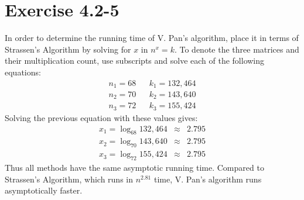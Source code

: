 \documentclass{article}
\begin{document}
\section*{Exercise 4.2-5}

In order to determine the running time of V. Pan's algorithm, place it in terms of Strassen's Algorithm by solving for $x$ in $n^x = k$. To denote the three matrices and their multiplication count, use subscripts and solve each of the following equations:
\begin{eqnarray*}
	n_1 = 68 & & k_1 = 132,464 \\
	n_2 = 70 & & k_2 = 143,640 \\
	n_3 = 72 & & k_3 = 155,424
\end{eqnarray*}
Solving the previous equation with these values gives:
\begin{eqnarray*}
	x_1 = \log_{68}{132,464} & \approx & 2.795 \\
	x_2 = \log_{70}{143,640} & \approx & 2.795 \\
	x_3 = \log_{72}{155,424} & \approx & 2.795
\end{eqnarray*}
Thus all methods have the same asymptotic running time. Compared to Strassen's Algorithm, which runs in $n^{2.81}$ time, V. Pan's algorithm runs asymptotically faster.
\end{document}
